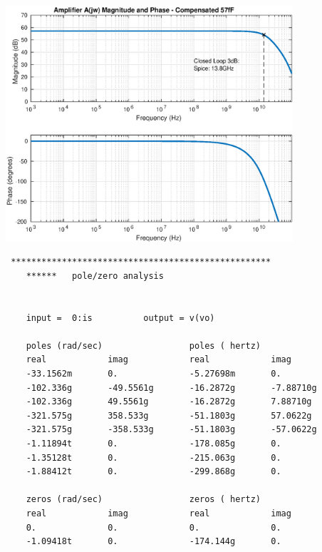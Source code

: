 \documentclass[12pt,a4paper]{article}
\begin{document}
\pagebreak

{\centering
	\includegraphics[width=0.8\textwidth]{plots/part_j_a.eps}
\par}

\begin{verbatim}
 ***************************************************
    ******   pole/zero analysis


    input =  0:is          output = v(vo)

    poles (rad/sec)                 poles ( hertz)
    real            imag            real            imag
    -33.1562m       0.              -5.27698m       0.
    -102.336g       -49.5561g       -16.2872g       -7.88710g
    -102.336g       49.5561g        -16.2872g       7.88710g
    -321.575g       358.533g        -51.1803g       57.0622g
    -321.575g       -358.533g       -51.1803g       -57.0622g
    -1.11894t       0.              -178.085g       0.
    -1.35128t       0.              -215.063g       0.
    -1.88412t       0.              -299.868g       0.

    zeros (rad/sec)                 zeros ( hertz)
    real            imag            real            imag
    0.              0.              0.              0.
    -1.09418t       0.              -174.144g       0.
\end{verbatim}

\pagebreak



\pagebreak
\end{document}
